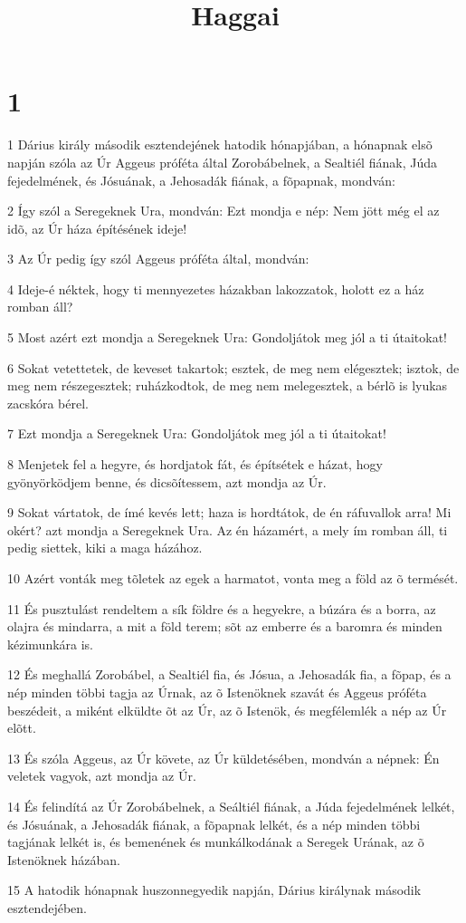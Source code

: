 

\title{Haggai}


\chapter{1}

\par 1 Dárius király második esztendejének hatodik hónapjában, a hónapnak elsõ napján szóla az Úr Aggeus próféta  által Zorobábelnek, a Sealtiél fiának, Júda fejedelmének, és Jósuának, a Jehosadák fiának, a fõpapnak, mondván:
\par 2 Így szól a Seregeknek Ura, mondván: Ezt mondja e nép: Nem jött még el az idõ, az Úr háza építésének ideje!
\par 3 Az Úr pedig így szól Aggeus próféta által, mondván:
\par 4 Ideje-é néktek, hogy ti mennyezetes házakban lakozzatok, holott ez a ház romban áll?
\par 5 Most azért ezt mondja a Seregeknek Ura: Gondoljátok meg jól a ti útaitokat!
\par 6 Sokat vetettetek, de keveset takartok; esztek, de meg nem elégesztek; isztok, de meg nem részegesztek; ruházkodtok, de meg nem melegesztek, a bérlõ is lyukas zacskóra bérel.
\par 7 Ezt mondja a Seregeknek Ura: Gondoljátok meg jól a ti útaitokat!
\par 8 Menjetek fel a hegyre, és hordjatok fát, és építsétek e házat, hogy gyönyörködjem benne, és dicsõítessem, azt mondja az Úr.
\par 9 Sokat vártatok, de ímé kevés lett; haza is hordtátok, de én ráfuvallok arra! Mi okért? azt mondja a Seregeknek Ura. Az én házamért, a mely ím romban áll, ti pedig siettek, kiki a maga házához.
\par 10 Azért vonták meg tõletek az egek a harmatot, vonta meg a föld az õ termését.
\par 11 És pusztulást rendeltem a sík földre és a hegyekre, a búzára és a borra, az olajra és mindarra, a mit a föld terem; sõt az emberre és a baromra és minden kézimunkára is.
\par 12 És meghallá Zorobábel, a Sealtiél fia, és Jósua, a Jehosadák fia, a fõpap, és a nép minden többi tagja az Úrnak, az õ Istenöknek szavát és Aggeus próféta beszédeit, a miként elküldte õt az Úr, az õ Istenök, és megfélemlék a nép az Úr elõtt.
\par 13 És szóla Aggeus, az Úr követe, az Úr küldetésében, mondván a népnek: Én veletek vagyok, azt mondja az Úr.
\par 14 És felindítá az Úr Zorobábelnek, a Seáltiél fiának, a Júda fejedelmének lelkét, és Jósuának, a Jehosadák fiának, a fõpapnak lelkét, és a nép minden többi tagjának lelkét is, és bemenének és munkálkodának a Seregek Urának, az õ Istenöknek házában.
\par 15 A hatodik hónapnak huszonnegyedik napján, Dárius királynak második esztendejében.

